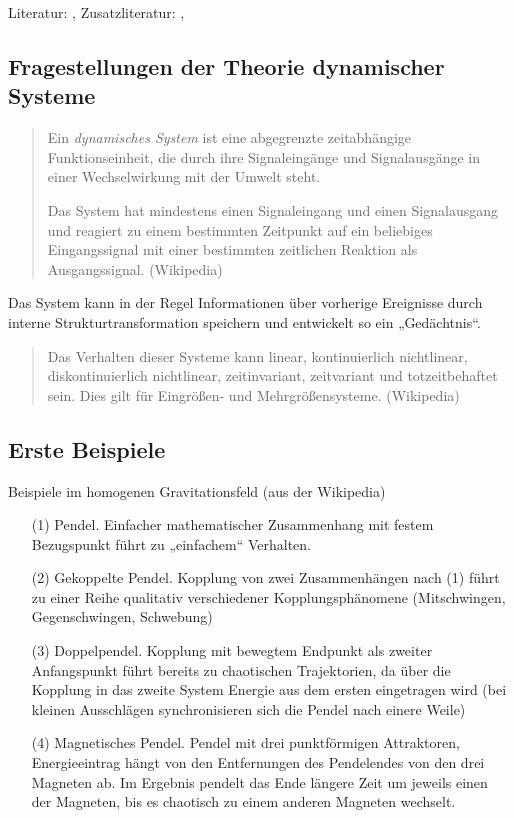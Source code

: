 \documentclass[11pt,a4paper]{article}
\begin{document}
Literatur: \cite{Prigogine1993}, Zusatzliteratur: \cite{Jantsch1992},
\cite{Jooss2017}

\subsection{Fragestellungen der Theorie dynamischer Systeme}
\begin{quote}  
  Ein \emph{dynamisches System} ist eine abgegrenzte zeitabhängige
  Funktionseinheit, die durch ihre Signaleingänge und Signalausgänge in einer
  Wechselwirkung mit der Umwelt steht. 

  Das System hat mindestens einen Signaleingang und einen Signalausgang und
  reagiert zu einem bestimmten Zeitpunkt auf ein beliebiges Eingangssignal mit
  einer bestimmten zeitlichen Reaktion als Ausgangssignal. (Wikipedia)
\end{quote}
Das System kann in der Regel Informationen über vorherige Ereignisse durch
interne Strukturtransformation speichern und entwickelt so ein „Gedächtnis“.
\begin{quote}
  Das Verhalten dieser Systeme kann linear, kontinuierlich nichtlinear,
  diskontinuierlich nichtlinear, zeitinvariant, zeitvariant und
  totzeitbehaftet sein. Dies gilt für Eingrößen- und Mehrgrößensysteme.
  (Wikipedia)
\end{quote}

\subsection{Erste Beispiele}

Beispiele im homogenen Gravitationsfeld (aus der Wikipedia)
\begin{itemize}
\item[(1)] Pendel. Einfacher mathematischer Zusammenhang mit festem
  Bezugspunkt führt zu „einfachem“ Verhalten.
\item[(2)] Gekoppelte Pendel. Kopplung von zwei Zusammenhängen nach (1) führt
  zu einer Reihe qualitativ verschiedener Kopplungsphänomene (Mitschwingen,
  Gegenschwingen, Schwebung)
\item[(3)] Doppelpendel.  Kopplung mit bewegtem Endpunkt als zweiter
  Anfangspunkt führt bereits zu chaotischen Trajektorien, da über die Kopplung
  in das zweite System Energie aus dem ersten eingetragen wird (bei kleinen
  Ausschlägen synchronisieren sich die Pendel nach einere Weile)
\item[(4)] Magnetisches Pendel. Pendel mit drei punktförmigen Attraktoren,
  Energieeintrag hängt von den Entfernungen des Pendelendes von den drei
  Magneten ab. Im Ergebnis pendelt das Ende längere Zeit um jeweils einen der
  Magneten, bis es chaotisch zu einem anderen Magneten wechselt.
\end{itemize}
\end{document}
